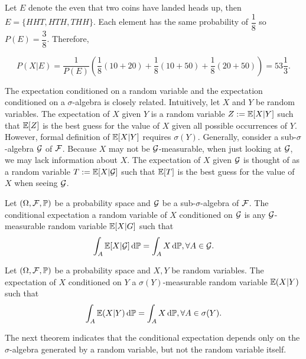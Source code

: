 \begin{solution}
  Let $E$ denote the even that two coins have landed heads up, then $E=\{HHT, HTH, THH\}$. Each element has the same probability of $\dfrac{1}{8}$ so $P(E)=\dfrac{3}{8}$. Therefore,

  $$P(X|E)=\dfrac{1}{P(E)}\left(\dfrac{1}{8}(10+20)+\dfrac{1}{8}(10+50)+\dfrac{1}{8}(20+50)\right)=53\dfrac{1}{3}.$$
\end{solution}

The expectation conditioned on a random variable and the expectation conditioned on a $\sigma$-algebra is closely related. Intuitively, let $X$ and $Y$ be random variables. The expectation of $X$ given $Y$ is a random variable $Z := \mathbb{E}[X|Y]$ such that $\mathbb{E}[Z]$ is the best guess for the value of $X$ given all possible occurrences of $Y$. However, formal definition of $\mathbb{E}[X|Y]$ requires $\sigma(Y)$. Generally, consider a sub-$\sigma$-algebra $\mathcal{G}$ of $\mathcal{F}$. Because $X$ may not be $\mathcal{G}$-measurable, when just looking at $\mathcal{G}$, we may lack information about $X$. The expectation of $X$ given $\mathcal{G}$ is thought of as a random variable $T:= \mathbb{E}[X|\mathcal{G}]$ such that $\mathbb{E}[T]$ is the best guess for the value of $X$ when seeing $\mathcal{G}$.

\begin{definition}
  Let $(\Omega, \mathcal{F}, \mathbb{P})$ be a probability space and $\mathcal{G}$ be a sub-$\sigma$-algebra of $\mathcal{F}$. The conditional expectation a random variable of $X$ conditioned on $\mathcal{G}$ is any $\mathcal{G}$-measurable random variable $\mathbb{E}[X|G]$ such that
  \begin{equation}
    \int_A \mathbb{E}[X|\mathcal{G}]\,\mathrm{d} \mathbb{P}=\int_A X\,\mathrm{d} \mathbb{P}, \forall A\in\mathcal{G}.
  \end{equation}
\end{definition}

\begin{definition}
  Let $(\Omega, \mathcal{F}, \mathbb{P})$ be a probability space and $X,Y$ be random variables. The expectation of $X$ conditioned on $Y$ a $\sigma(Y)$-measurable random variable $\mathbb{E}(X|Y)$ such that
  \begin{equation}
    \int_A \mathbb{E}(X|Y)\,\mathrm{d} \mathbb{P} = \int_A X\,\mathrm{d} \mathbb{P}, \forall A\in\sigma(Y).
  \end{equation}
\end{definition}

The next theorem indicates that the conditional expectation depends only on the $\sigma$-algebra generated by a random variable, but not the random variable itself.

